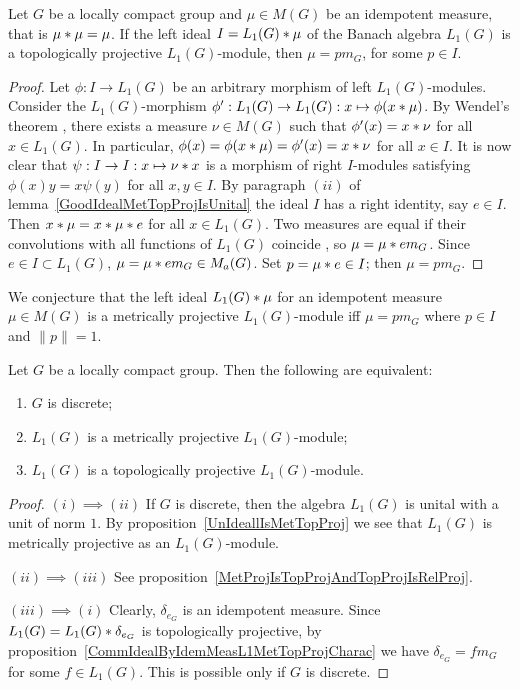 \begin{proposition}\label{CommIdealByIdemMeasL1MetTopProjCharac} Let $G$ be a
locally compact group and  $\mu\in M(G)$ be an idempotent measure, that is
$\mu\ast\mu=\mu$. If the left ideal $I=L_1(G)\ast\mu$ of the Banach algebra
$L_1(G)$ is a topologically projective $L_1(G)$-module, then $\mu=p m_G$, for some
$p\in I$.
\end{proposition}
\begin{proof} Let $\phi:I\to L_1(G)$ be an arbitrary morphism of left
$L_1(G)$-modules. Consider the $L_1(G)$-morphism $\phi':L_1(G)\to
L_1(G):x\mapsto\phi(x\ast\mu)$. By Wendel's theorem \cite[theorem 1]{WendLeftCentrzrs}, there exists a measure $\nu\in M(G)$ such that
$\phi'(x)=x\ast\nu$ for all $x\in L_1(G)$. In particular,
$\phi(x)=\phi(x\ast\mu)=\phi'(x)=x\ast\nu$ for all $x\in I$. It is now
clear that $\psi:I\to I:x\mapsto\nu\ast x$ is a morphism of right $I$-modules
satisfying $\phi(x)y=x\psi(y)$ for all $x,y\in I$. By paragraph $(ii)$ of
lemma~\ref{GoodIdealMetTopProjIsUnital} the ideal $I$ has a right identity, say
$e\in I$. Then $x\ast\mu=x\ast\mu\ast e$ for all $x\in L_1(G)$. Two
measures are equal if their convolutions with all functions of $L_1(G)$ coincide
\cite[corollary 3.3.24]{DalBanAlgAutCont}, so $\mu=\mu\ast e m_G$. Since
$e\in I\subset L_1(G)$, $\mu=\mu\ast e m_G\in M_a(G)$. 
Set $p=\mu\ast e\in I$; then $\mu=p m_G$.
\end{proof}

We conjecture that the left ideal $L_1(G)\ast \mu$ for an idempotent measure
$\mu\in M(G)$ is a metrically projective $L_1(G)$-module iff $\mu=p m_G$ where $p\in I$
and $\lVert p\rVert=1$.

\begin{theorem}\label{L1ModL1MetTopProjCharac} Let $G$ be a locally compact
group. Then the following are equivalent:

\begin{enumerate}[label = (\roman*)]
    \item $G$ is discrete;

    \item $L_1(G)$ is a metrically projective $L_1(G)$-module;

    \item $L_1(G)$ is a topologically projective $L_1(G)$-module.
\end{enumerate}
\end{theorem}
\begin{proof} $(i)\implies (ii)$ If $G$ is discrete, then the algebra $L_1(G)$ 
is unital with a unit of norm $1$. By  proposition~\ref{UnIdeallIsMetTopProj} 
we see that $L_1(G)$ is metrically projective as an $L_1(G)$-module.

$(ii)\implies (iii)$ See
proposition~\ref{MetProjIsTopProjAndTopProjIsRelProj}.

$(iii) \implies (i)$ Clearly, $\delta_{e_G}$ is an idempotent measure. Since
$L_1(G)=L_1(G)\ast \delta_{e_G}$ is topologically projective, by
proposition~\ref{CommIdealByIdemMeasL1MetTopProjCharac} 
we have $\delta_{e_G}=f m_G$ for some $f\in L_1(G)$. This is possible only 
if $G$ is discrete.
\end{proof}

